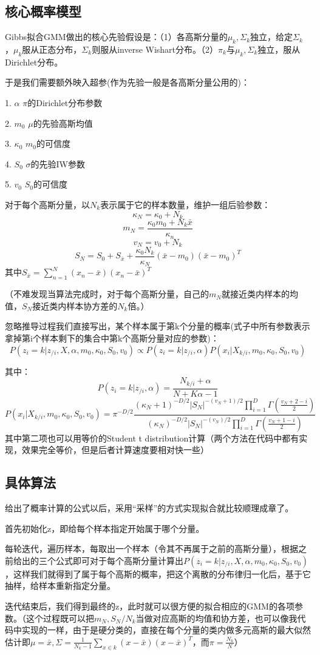 \documentclass[hyperref,UTF8]{ctexart}
\begin{document}
\subsection*{核心概率模型}
Gibbs拟合GMM做出的核心先验假设是：（1）各高斯分量的$\mu_k,\Sigma_k$独立，给定$\Sigma_k$，$\mu_k$服从正态分布，$\Sigma_k$则服从inverse Wishart分布。（2）$\pi_k$与$\mu_k,\Sigma_k$独立，服从Dirichlet分布。
\par 于是我们需要额外映入超参(作为先验一般是各高斯分量公用的)：
\par 1. $\alpha$ \qquad  $\pi$的Dirichlet分布参数
\par 2. $m_0$ \qquad   $\mu$的先验高斯均值
\par 3. $\kappa_0$ \qquad $m_0$的可信度
\par 4. $S_0$ \qquad $\sigma$的先验IW参数
\par 5. $v_0$ \qquad $S_0$的可信度
\par 对于每个高斯分量，以$N_k$表示属于它的样本数量，维护一组后验参数：
\[\kappa_N = \kappa_0 + N_k\]
\[m_{N}=\frac{\kappa_0 m_0 +N_k \bar x}{\kappa_n} \]
\[v_N=v_0+N_k\]
\[S_N = S_0 + S_{\bar x} + \frac{\kappa_0 N_k}{\kappa_N}(\bar x - m_0)(\bar x - m_0)^T\]
其中$S_{\bar x}=\sum_{n=1}^{N}(x_n-\bar x)(x_n-\bar x)^T$
\par （不难发现当算法完成时，对于每个高斯分量，自己的$m_{N}$就接近类内样本的均值，$S_{N}$接近类内样本协方差的$N_k$倍。）
\par 忽略推导过程我们直接写出，某个样本属于第k个分量的概率(式子中所有参数表示拿掉第i个样本剩下的集合中第k个高斯分量对应的参数)：
\[P(z_i=k|z_{/i},X,\alpha,m_0,\kappa_0,S_0,v_0) \propto P(z_i=k|z_{/i},\alpha)P(x_i|X_{k/i},m_0,\kappa_0,S_0,v_0)\]
\par 其中：
\[P(z_i=k|z_{/i},\alpha)=\frac{N_{k/i}+\alpha}{N+K\alpha -1}\]
\[P(x_i|X_{k/i},m_0,\kappa_0,S_0,v_0)=\pi^{-D/2}\frac{(\kappa_N +1)^{-D/2}{|S_N|}^{-(v_N+1)/2}\prod_{i=1}^{D}\Gamma(\frac{v_N+2-i}{2})} {(\kappa_N )^{-D/2}{|S_N|}^{-(v_N)/2}\prod_{i=1}^{D}\Gamma(\frac{v_N+1-i}{2})}\]
其中第二项也可以用等价的Student t distribution计算（两个方法在代码中都有实现，效果完全等价，但是后者计算速度要相对快一些）
\subsection*{具体算法}
给出了概率计算的公式以后，采用“采样”的方式实现拟合就比较顺理成章了。
\par 首先初始化z，即给每个样本指定开始属于哪个分量。
\par 每轮迭代，遍历样本，每取出一个样本（令其不再属于之前的高斯分量），根据之前给出的三个公式即可对于每个高斯分量计算出$P(z_i=k|z_{/i},X,\alpha,m_0,\kappa_0,S_0,v_0)$，这样我们就得到了属于每个高斯的概率，把这个离散的分布律归一化后，基于它抽样，给样本重新指定分量。
\par 迭代结束后，我们得到最终的z，此时就可以很方便的拟合相应的GMM的各项参数。（这个过程既可以把$m_N,S_N/N_k$当做对应高斯的均值和协方差，也可以像我代码中实现的一样，由于是硬分类的，直接在每个分量的类内做多元高斯的最大似然估计即$\mu=\bar x,\Sigma = \frac{1}{N_k-1}\sum_{x \in k}(x-\bar x)(x-\bar x)^T$，而$\pi=\frac{N_k}{N}$）
\end{document}
